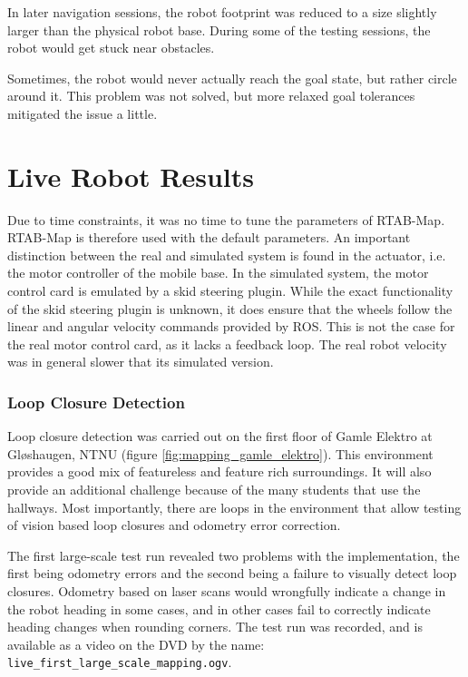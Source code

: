 In later navigation sessions, the robot footprint was reduced to a size slightly larger than the physical robot base. During some of the testing sessions, the robot would get stuck near obstacles. 

Sometimes, the robot would never actually reach the goal state, but rather circle around it. This problem was not solved, but more relaxed goal tolerances mitigated the issue a little. 

\section{Live Robot Results}

Due to time constraints, it was no time to tune the parameters of \ac{RTAB-Map}. \ac{RTAB-Map} is therefore used with the default parameters. An important distinction between the real and simulated system is found in the actuator, i.e. the motor controller of the mobile base. In the simulated system, the motor control card is emulated by a skid steering plugin. While the exact functionality of the skid steering plugin is unknown, it does ensure that the wheels follow the linear and angular velocity commands provided by \ac{ROS}. This is not the case for the real motor control card, as it lacks a feedback loop. The real robot velocity was in general slower that its simulated version.

\subsubsection{Loop Closure Detection}

Loop closure detection was carried out on the first floor of Gamle Elektro at Gløshaugen, NTNU (figure \ref{fig:mapping_gamle_elektro}). This environment provides a good mix of featureless and feature rich surroundings. It will also provide an additional challenge because of the many students that use the hallways. Most importantly, there are loops in the environment that allow testing of vision based loop closures and odometry error correction. 

The first large-scale test run revealed two problems with the implementation, the first being odometry errors and the second being a failure to visually detect loop closures. Odometry based on laser scans would wrongfully indicate a change in the robot heading in some cases, and in other cases fail to correctly indicate heading changes when rounding corners. The test run was recorded, and is available as a video on the DVD by the name: \texttt{live\_first\_large\_scale\_mapping.ogv}.

